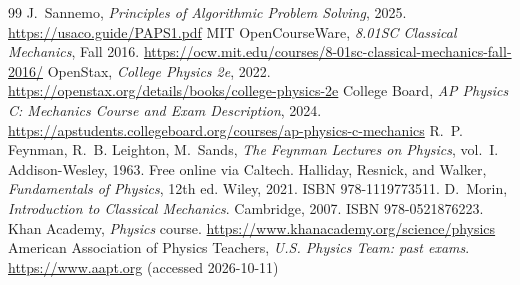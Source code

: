\begin{thebibliography}{99}
 J.~Sannemo, \emph{Principles of Algorithmic Problem Solving}, 2025. \url{https://usaco.guide/PAPS1.pdf}
 MIT OpenCourseWare, \emph{8.01SC Classical Mechanics}, Fall 2016. \url{https://ocw.mit.edu/courses/8-01sc-classical-mechanics-fall-2016/}
 OpenStax, \emph{College Physics 2e}, 2022. \url{https://openstax.org/details/books/college-physics-2e}
 College Board, \emph{AP Physics C: Mechanics Course and Exam Description}, 2024. \url{https://apstudents.collegeboard.org/courses/ap-physics-c-mechanics}
 R.~P. Feynman, R.~B. Leighton, M.~Sands, \emph{The Feynman Lectures on Physics}, vol.~I. Addison-Wesley, 1963. Free online via Caltech.
 Halliday, Resnick, and Walker, \emph{Fundamentals of Physics}, 12th ed. Wiley, 2021. ISBN 978-1119773511.
 D.~Morin, \emph{Introduction to Classical Mechanics}. Cambridge, 2007. ISBN 978-0521876223.
 Khan Academy, \emph{Physics} course. \url{https://www.khanacademy.org/science/physics}
 American Association of Physics Teachers, \emph{U.S. Physics Team: past exams}. \url{https://www.aapt.org} (accessed 2026-10-11)
\end{thebibliography}
